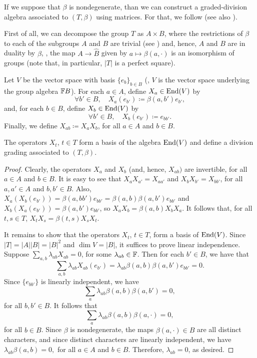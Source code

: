 If we suppose that $\beta$ is nondegenerate, than we can construct a graded-division algebra associated to $(T,\beta)$ using matrices. 
For that, we follow \cite[Remark 18]{EK15} (see also \cite[Remark 2.16]{livromicha}).

First of all, we can decompose the group $T$ as $A\times B$, where the restrictions of $\beta$ to each of the subgroups $A$ and $B$ are trivial (see \cite[page 36]{livromicha}) and, hence, $A$ and $B$ are in duality by $\beta$, \ie, the map $A \to \widehat B$ given by $a \mapsto \beta(a, \cdot)$ is an isomorphism of groups (note that, in particular, $|T|$ is a perfect square). 

Let $V$ be the vector space with basis $\{e_b\}_{b\in B}$ (\ie, $V$ is the vector space underlying the group algebra $\mathbb{F} B$). 
For each $a\in A$, define $X_a\in \operatorname{End}(V)$ by
\[
    \forall b' \in B, \quad X_a (e_{b'}) \coloneqq \beta(a, b')e_{b'},
\]
and, for each $b\in B$, define $X_b\in \operatorname{End}(V)$ by
\[
    \forall b' \in B, \quad X_b (e_{b'}) \coloneqq e_{bb'}.
\]
Finally, we define $X_{ab} \coloneqq X_a X_b$, for all $a\in A$ and $b\in B$. 

\begin{prop}\label{prop:X_t-is-basis}
    The operators $X_t$, $t\in T$ form a basis of the algebra $\operatorname{End}(V)$ and define a division grading associated to $(T, \beta)$. 
\end{prop}

\begin{proof}
    Clearly, the operators $X_a$ and $X_b$ (and, hence, $X_{ab})$ are invertible, for all $a\in A$ and $b\in B$. 
    It is easy to see that $X_a X_{a'} = X_{aa'}$ and $X_{b} X_{b'} = X_{bb'}$, for all $a, a' \in A$ and $b, b'\in B$. 
    Also, $X_a ( X_b(e_{b'}) ) = \beta(a, bb') e_{bb'} = \beta(a, b) \beta(a,b') e_{bb'}$ and $X_b ( X_a(e_{b'}) ) = \beta(a, b') e_{bb'}$, so $X_a X_b = \beta(a,b) X_b X_a$. 
    It follows that, for all $t,s \in T$, $X_t X_s = \beta(t,s) X_s X_t$.

    It remains to show that the operators $X_t$, $t\in T$, form a basis of $\operatorname{End}(V)$. 
    Since $|T| = |A||B| = |B|^2$ and $\dim V = |B|$, it suffices to prove linear independence. 
    Suppose $\sum_{a,b} \lambda_{ab} X_{ab} = 0$, for some $\lambda_{ab} \in \mathbb{F}$. 
    Then for each $b' \in B$, we have that
    \[
        \sum_{a,b} \lambda_{ab} X_{ab} (e_{b'}) = \lambda_{ab} \beta(a, b) \beta(a,b') e_{bb'} = 0.
    \]
    Since $\{ e_{bb'} \}$ is linearly independent, we have
    \[
        \sum_a \lambda_{ab} \beta(a, b) \beta(a,b') = 0,
    \]
    for all $b,b' \in B$. 
    It follows that
    \[
        \sum_a \lambda_{ab} \beta(a, b) \beta(a, \cdot) = 0,
    \]
    for all $b\in B$. 
    Since $\beta$ is nondegenerate, the maps $\beta(a, \cdot) \in \widehat B$ are all distinct characters, and since distinct characters are linearly independent, we have
    $
        \lambda_{ab} \beta(a, b) = 0,
    $
    for all $a\in A$ and $b\in B$. 
    Therefore, $\lambda_{ab} = 0$, as desired. 
\end{proof}

